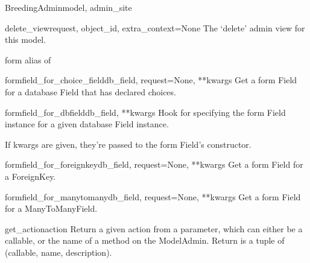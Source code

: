 \documentclass[letterpaper,10pt,english]{sphinxmanual}
\begin{document}
\begin{classdesc}{BreedingAdmin}{model, admin\_site}
\hypertarget{animal.admin.BreedingAdmin.delete_view}{}\begin{methoddesc}{delete\_view}{request, object\_id, extra\_context=None}
The `delete' admin view for this model.
\end{methoddesc}

\hypertarget{animal.admin.BreedingAdmin.form}{}\begin{memberdesc}{form}
alias of 
\end{memberdesc}

\hypertarget{animal.admin.BreedingAdmin.formfield_for_choice_field}{}\begin{methoddesc}{formfield\_for\_choice\_field}{db\_field, request=None, **kwargs}
Get a form Field for a database Field that has declared choices.
\end{methoddesc}

\hypertarget{animal.admin.BreedingAdmin.formfield_for_dbfield}{}\begin{methoddesc}{formfield\_for\_dbfield}{db\_field, **kwargs}
Hook for specifying the form Field instance for a given database Field
instance.

If kwargs are given, they're passed to the form Field's constructor.
\end{methoddesc}

\hypertarget{animal.admin.BreedingAdmin.formfield_for_foreignkey}{}\begin{methoddesc}{formfield\_for\_foreignkey}{db\_field, request=None, **kwargs}
Get a form Field for a ForeignKey.
\end{methoddesc}

\hypertarget{animal.admin.BreedingAdmin.formfield_for_manytomany}{}\begin{methoddesc}{formfield\_for\_manytomany}{db\_field, request=None, **kwargs}
Get a form Field for a ManyToManyField.
\end{methoddesc}

\hypertarget{animal.admin.BreedingAdmin.get_action}{}\begin{methoddesc}{get\_action}{action}
Return a given action from a parameter, which can either be a callable,
or the name of a method on the ModelAdmin.  Return is a tuple of
(callable, name, description).
\end{methoddesc}


\end{classdesc}
\end{document}

